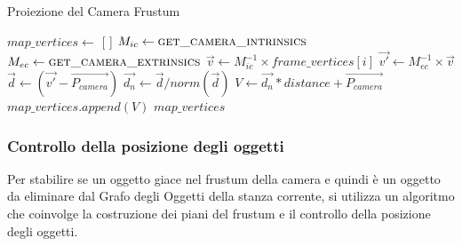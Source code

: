 \begin{algorithm}
  \caption{Proiezione del Camera Frustum}
  \begin{algorithmic}[1]
    \State $map\_vertices \gets$ [ ]
    \State $M_{ic} \gets \Call{get\_camera\_intrinsics}{}$
    \State $M_{ec} \gets \Call{get\_camera\_extrinsics}{}$
    \State $\vec{v} \gets M_{ic}^{-1} \times frame\_vertices[i]$
    \State $\vec{v'} \gets M_{ec}^{-1} \times \vec{v}$
    \State $\vec{d} \gets (\vec{v'} - \overrightarrow{P_{camera}})$
    \State $\vec{d_n} \gets \vec{d} / norm(\vec{d})$
    \State $V \gets \vec{d_n} * distance + \overrightarrow{P_{camera}}$
    \State $map\_vertices.append(V)$
    \EndFor
    \State \Return $map\_vertices$
    \EndProcedure
  \end{algorithmic}
\end{algorithm}
\subsubsection{Controllo della posizione degli oggetti}
Per stabilire se un oggetto giace nel frustum della camera e quindi è un oggetto da eliminare dal Grafo degli Oggetti della stanza corrente, si utilizza un algoritmo che coinvolge la costruzione dei piani del frustum e il controllo della posizione degli oggetti.
